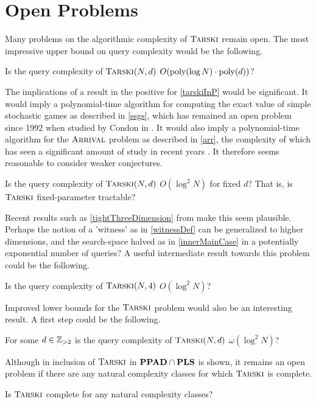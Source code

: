 \section{Open Problems}
Many problems on the algorithmic complexity of $\textsc{Tarski}$ remain 
open. The most impressive upper bound on query complexity would be the following.
\begin{open} \label{tarskiInP}
  Is the query complexity of $\textsc{Tarski}(N, d)$ $O(\mathrm{poly}(\log N) \cdot \mathrm{poly}(d))$?
\end{open}
The implications of a result in the positive for \cref{tarskiInP} would be significant. 
It would imply a polynomial-time algorithm for
computing the exact value of simple stochastic games as described in \cref{ssgs},
which has remained an open problem since 1992 when studied by Condon in \citep{condon}.
It would also imply a polynomial-time algorithm for the $\textsc{Arrival}$ problem as described in \cref{arr},
the complexity of which has seen a significant amount of study in recent years
\citep{gärtner2021subexponential, gärtner2018arrival, arrivalBasic, arrLowerBound}. It therefore seems reasonable to consider weaker conjectures.
\begin{open} \label{tarskiFixedParameterTractable}
  Is the query complexity of 
  $\textsc{Tarski}(N, d)$ $O(\log^2 N)$ for fixed $d$? That is, is $\textsc{Tarski}$ fixed-parameter tractable?
\end{open}
Recent results such as \cref{tightThreeDimension} from \citep{fasterTarski} make this seem
plausible. Perhaps the notion of a 'witness' as in \cref{witnessDef} can be
generalized to higher dimensions, and the search-space halved as in \cref{innerMainCase}
in a potentially exponential number of queries? A useful intermediate result towards this problem could be
the following.
\begin{open} \label{tightFourDimension}
  Is the query complexity of $\textsc{Tarski}(N, 4)$ $O(\log^2 N)$?
\end{open}
Improved lower bounds for the $\textsc{Tarski}$ problem would also be an interesting
result. A first step could be the following.
\begin{open}
  For some $d \in \mathbb{Z}_{> 2}$ is the query complexity of
  $\textsc{Tarski}(N, d)$ $\omega(\log^2 N)$?
\end{open}
Although in \citep{lowerBound} inclusion of $\textsc{Tarski}$ in $\mathbf{PPAD} \cap \mathbf{PLS}$ is shown,
it remains an open problem if there are any natural complexity classes for which $\textsc{Tarski}$ is
complete.
\begin{open}
  Is $\textsc{Tarski}$ complete for any natural complexity classes?
\end{open}
